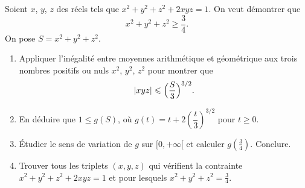 Soient $x$, $y$, $z$ des réels tels que $x^2 + y^2 + z^2 + 2xyz = 1$. On veut
démontrer que
\[
x^2 + y^2 + z^2 \geqslant \frac34 .
\]
On pose $S = x^2 + y^2 + z^2$.
\begin{enumerate}
  \item Appliquer l'inégalité entre moyennes arithmétique et géométrique
  aux trois nombres positifs ou nuls $x^2$, $y^2$, $z^2$ pour montrer que
  \[
  |xyz| \leqslant \Bigl(\frac{S}{3}\Bigr)^{3/2}.
  \]
  \item En déduire que $1 \leqslant g(S)$, où
  $g(t) = t + 2\left(\dfrac{t}{3}\right)^{3/2}$ pour $t \geqslant 0$.
  \item Étudier le sens de variation de $g$ sur $[0, +\infty[$ et calculer
  $g\!\left(\frac34\right)$. Conclure.
  \item Trouver tous les triplets $(x, y, z)$ qui vérifient la
  contrainte $x^2 + y^2 + z^2 + 2xyz = 1$ et pour lesquels $x^2 + y^2 + z^2 = \frac34$.
\end{enumerate}
